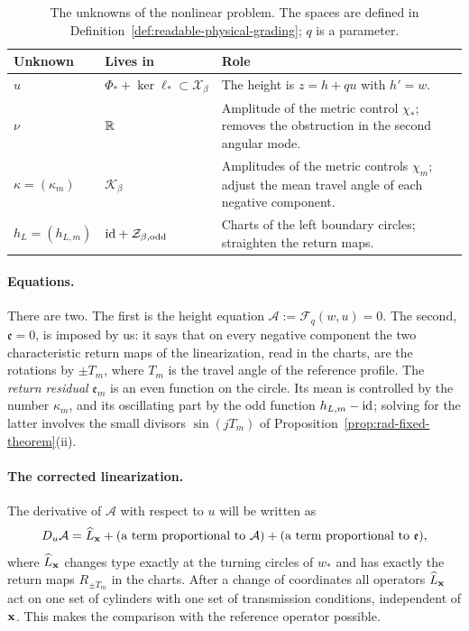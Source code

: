 \begin{table}[htbp]
\centering
\begin{tabularx}{\linewidth}{@{}l l Y@{}}
\toprule
Unknown & Lives in & Role\\
\midrule
$u$ & $\Phi_*+\ker\ell_*\subset\mathcal X_\beta$ &
 The height is $z=h+qu$ with $h'=w$.\\
$\nu$ & $\mathbb R$ &
 Amplitude of the metric control $\chi_*$; removes the obstruction in
 the second angular mode.\\
$\kappa=(\kappa_m)$ & $\mathcal K_\beta$ &
 Amplitudes of the metric controls $\chi_m$; adjust the mean travel
 angle of each negative component.\\
$h_L=(h_{L,m})$ & $\mathrm{id}+\mathcal Z_{\beta,\mathrm{odd}}$ &
 Charts of the left boundary circles; straighten the return maps.\\
\bottomrule
\end{tabularx}
\caption{The unknowns of the nonlinear problem. The spaces are defined
in Definition~\ref{def:readable-physical-grading}; $q$ is a parameter.}
\label{tab:unknowns}
\end{table}

\paragraph{Equations.}
There are two. The first is the height equation
$\mathcal A:=\mathcal F_q(w,u)=0$. The second, $\mathfrak e=0$, is
imposed by us: it says that on every negative component the two
characteristic return maps of the linearization, read in the charts,
are the rotations by $\pm T_m$, where $T_m$ is the travel angle of the
reference profile. The \emph{return residual} $\mathfrak e_m$ is an
even function on the circle. Its mean is controlled by the number
$\kappa_m$, and its oscillating part by the odd function
$h_{L,m}-\mathrm{id}$; solving for the latter involves the small divisors
$\sin(jT_m)$ of Proposition~\ref{prop:rad-fixed-theorem}(ii).

\paragraph{The corrected linearization.}
The derivative of $\mathcal A$ with respect to $u$ will be written as
\[
 D_u\mathcal A=\widehat L_{\mathbf x}
 +(\text{a term proportional to }\mathcal A)
 +(\text{a term proportional to }\mathfrak e),
\]
where $\widehat L_{\mathbf x}$ changes type exactly at the turning circles of
$w_*$ and has exactly the return maps $R_{\pm T_m}$ in the charts.
After a change of coordinates all operators $\widehat L_{\mathbf x}$ act on
one set of cylinders with one set of transmission conditions,
independent of $\mathbf x$. This makes the comparison with the reference
operator possible.

